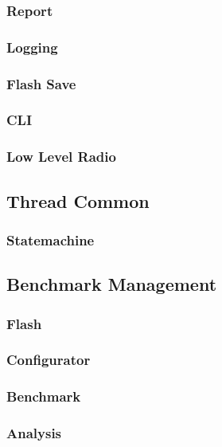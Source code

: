\subsubsection{Report}\label{subsubsec:Report}

\subsubsection{Logging}\label{subsubsec:Logging}

\subsubsection{Flash Save}\label{subsubsec:FlashSave}

\subsubsection{CLI}\label{subsubsec:CLI}

\subsubsection{Low Level Radio}\label{subsubsec:LowLevelRadio}



\subsection{Thread Common}\label{subsec:ThreadCommon}

\subsubsection{Statemachine}\label{subsubsec:Statemachine}



\subsection{Benchmark Management}\label{subsec:Benchmark Management}

\subsubsection{Flash}\label{subsubsec:Flash}

\subsubsection{Configurator}\label{subsubsec:Configurator}

\subsubsection{Benchmark}\label{subsubsec:Benchmark}

\subsubsection{Analysis}\label{subsubsec:Analysis}

